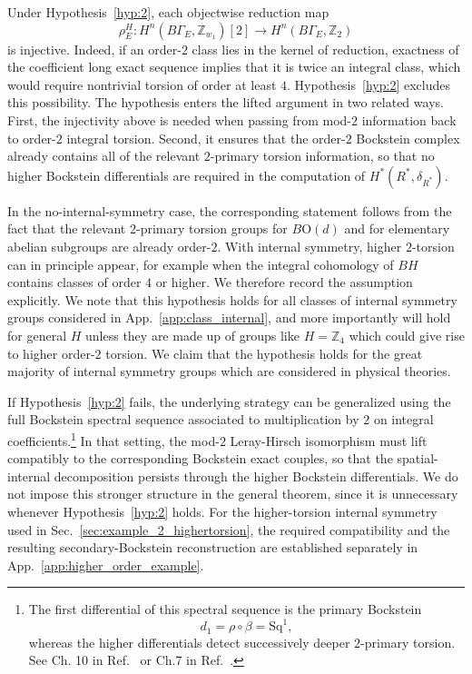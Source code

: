 \documentclass[aps,prx,reprint,superscriptaddress,twocolumn,amsmath,amssymb,amsfonts, nofootinbib]{revtex4-2}
\newcommand{\Z}{\mathbb{Z}}
\theoremstyle{apsstyle}
\begin{document}
\bigskip 

\noindent Under Hypothesis~\ref{hyp:2}, each objectwise reduction map
\begin{equation*}
    \rho_{E}^{H}:H^{n}(B\Gamma_E,\mathbb Z_{w_1})[2]\to H^{n}(B\Gamma_E,\mathbb Z_2)
\end{equation*}
is injective. Indeed, if an order-$2$ class lies in the kernel of reduction, exactness of the coefficient long exact sequence implies that it is twice an integral class, which would require nontrivial torsion of order at least $4$. Hypothesis~\ref{hyp:2} excludes this possibility. The hypothesis enters the lifted argument in two related ways. First, the injectivity above is needed when passing from mod-$2$ information back to order-$2$ integral torsion. Second, it ensures that the order-$2$ Bockstein complex already contains all of the relevant $2$-primary torsion information, so that no higher Bockstein differentials are required in the computation of $H^{*}(R^{*},\delta_{R^{*}})$.

\bigskip

\noindent In the no-internal-symmetry case, the corresponding statement follows from the fact that the relevant $2$-primary torsion groups for $B\mathrm{O}(d)$ and for elementary abelian subgroups are already order-$2$. With internal symmetry, higher $2$-torsion can in principle appear, for example when the integral cohomology of $BH$ contains classes of order $4$ or higher. We therefore record the assumption explicitly. We note that this hypothesis holds for all classes of internal symmetry groups considered in App.~\ref{app:class_internal}, and more importantly will hold for general $H$ unless they are made up of groups like $H=\Z_{4}$ which could give rise to higher order-$2$ torsion. We claim that the hypothesis holds for the great majority of internal symmetry groups which are considered in physical theories.

\bigskip 

\noindent If Hypothesis~\ref{hyp:2} fails, the underlying strategy can be generalized using the full Bockstein spectral sequence associated to multiplication by $2$ on integral coefficients.\footnote{The first differential of this spectral sequence is the primary Bockstein
\begin{equation*}
d_{1}=\rho\circ\beta=\mathrm{Sq}^{1},
\end{equation*}
whereas the higher differentials detect successively deeper $2$-primary torsion. See Ch. 10 in Ref.~\cite{McCleary2000} or Ch.7 in Ref.~\cite{Mosher2008}.}
In that setting, the mod-$2$ Leray-Hirsch isomorphism must lift compatibly to the corresponding Bockstein exact couples, so that the spatial-internal decomposition persists through the higher Bockstein differentials. We do not impose this stronger structure in the general theorem, since it is unnecessary whenever Hypothesis~\ref{hyp:2} holds. For the higher-torsion internal symmetry used in Sec.~\ref{sec:example_2_highertorsion}, the required compatibility and the resulting secondary-Bockstein reconstruction are established separately in App.~\ref{app:higher_order_example}.
\end{document}
